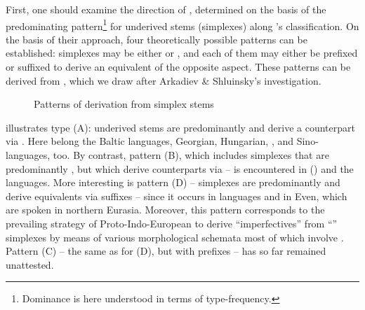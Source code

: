\documentclass[output=paper]{langsci/langscibook}
\begin{document}
First, one should examine the direction of , determined on the basis of the predominating pattern\footnote{Dominance is here understood in terms of type-frequency.} for underived stems (simplexes) along \citeauthor{ArkadievShluinsky2015}’s classification. On the basis of their approach, four theoretically possible patterns can be established: simplexes may be either  or , and each of them may either be prefixed or suffixed to derive an equivalent of the opposite aspect. These patterns can be derived from , which we draw after Arkadiev \& Shluinsky’s investigation.

\begin{figure}
\caption{Patterns of derivation from simplex stems}
\label{fig:wiemerserzant:1}

\end{figure}

 illustrates type (A): underived stems are predominantly  and derive a  counterpart via . Here belong the Baltic languages, Georgian, Hungarian, ,  and Sino- languages, too. By contrast, pattern (B), which includes simplexes that are predominantly , but which derive  counterparts via  – is encountered in  () and the  languages. More interesting is pattern (D) – simplexes are predominantly  and derive  equivalents via suffixes – since it occurs in  languages and in Even, which are spoken in northern Eurasia. Moreover, this pattern corresponds to the prevailing strategy of Proto-Indo-European to derive “imperfectives” from “” simplexes by means of various morphological schemata most of which involve . Pattern (C) – the same as for (D), but with prefixes – has so far remained unattested.
\end{document}
